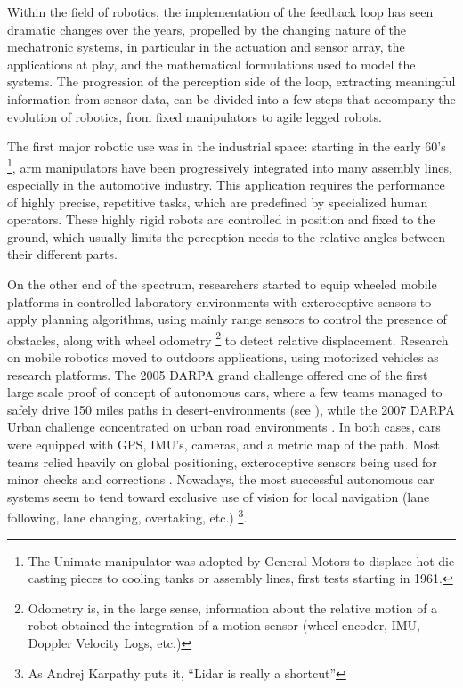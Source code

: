 Within the field of robotics, the implementation of the feedback loop has seen dramatic changes over the years, propelled by the changing nature 
of the mechatronic systems, in particular in the actuation and sensor array, the applications at play, and the mathematical formulations
used to model the systems. The progression of the perception side of the loop, extracting meaningful information from sensor data, can be divided into a few
steps that accompany the evolution of robotics, from fixed manipulators to agile legged robots. 

The first major robotic use was in the industrial space: 
starting in the early 60's \footnote{The Unimate manipulator was adopted by General Motors to displace hot die casting pieces to cooling tanks or assembly lines, first tests starting in 1961.}, 
arm manipulators have been progressively integrated into many assembly lines, especially in the automotive industry. 
This application requires the performance of highly precise, repetitive tasks, which are predefined by specialized human operators.
These highly rigid robots are controlled in position and fixed to the ground, which usually limits the perception needs to the relative angles between their different parts.

On the other end of the spectrum, researchers started to equip wheeled mobile platforms in controlled laboratory environments with exteroceptive sensors 
\cite{Nilsson1984ShakeyTR, chatila1985position} to apply planning algorithms, using mainly range sensors to control the presence of obstacles, along with wheel odometry \footnote{Odometry is, in the large sense, information 
about the relative motion of a robot obtained the integration of a motion sensor (wheel encoder, IMU, Doppler Velocity Logs, etc.)}
to detect relative displacement. 
Research on mobile robotics moved to outdoors applications, using motorized vehicles as research platforms. The 2005 DARPA grand challenge
offered one of the first large scale proof of concept of autonomous cars, where a few teams managed to safely drive 150 miles paths in desert-environments 
\cite{thrun2006stanley} (see ), while the 2007 DARPA Urban challenge concentrated on urban road environments \cite{urmson2008autonomous}. In both cases, cars were 
equipped with GPS, IMU's, cameras, and a metric map of the path. Most teams relied heavily on global positioning, exteroceptive sensors being used for 
minor checks and corrections \cite{hillel2014recent}. Nowadays, the most successful autonomous car systems 
seem to tend toward exclusive use of vision for local navigation (lane following, lane changing, overtaking, etc.) \footnote{As Andrej Karpathy puts it, “Lidar is really a shortcut”}. 

